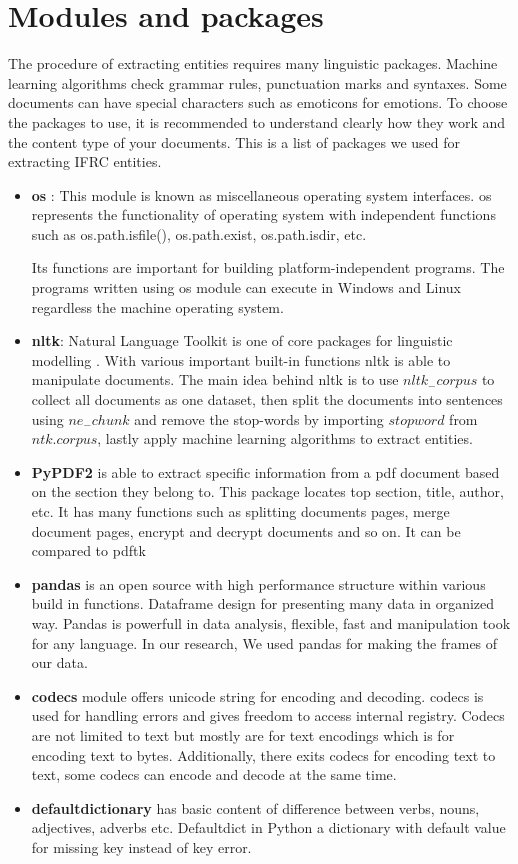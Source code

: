 \section{Modules and packages}
The procedure of extracting entities requires many linguistic packages. Machine learning algorithms check grammar rules, punctuation marks and syntaxes. Some
documents can have special characters such as emoticons for emotions. To choose the packages to use, it is recommended to understand clearly how they work and the content type of your documents. This is a list of packages we used for extracting IFRC entities.
\begin{itemize}
\item \textbf{os} : This module is  known as miscellaneous operating system interfaces. os represents the functionality of operating system with independent functions such as os.path.isfile(), os.path.exist, os.path.isdir, etc.  

  Its functions are important for building platform-independent programs. The programs written  using os module  can execute in Windows and Linux regardless the machine operating system. 

\item \textbf{nltk}: Natural Language Toolkit is one of core packages for linguistic modelling . With various important  built-in functions nltk is able to manipulate documents.  The main idea behind nltk is to use $nltk_{-}corpus$ to collect all documents as one dataset, then split the documents into sentences using $ne_{-}chunk$ and  remove the stop-words by  importing $stopword$ from $ntk.corpus$, lastly apply machine learning algorithms to extract entities.

\item \textbf{PyPDF2} is able to extract specific information from a pdf document based on the section they belong to. This package locates top section, title, author, etc. It has many functions such as splitting documents pages, merge document pages, encrypt and decrypt documents and so on. It can be compared to pdftk
\item \textbf{pandas} is an open source with high performance structure within various build in functions.
  Dataframe design for presenting many data in organized way. Pandas is powerfull in data analysis, flexible, fast and manipulation took for any language. In our research, We used pandas for making the frames of our data.
  
\item \textbf{codecs} module  offers unicode string for encoding and decoding. codecs is used for handling errors and gives freedom to access internal registry. Codecs are not limited to text but mostly are for text encodings which is for encoding text to bytes. Additionally, there exits codecs for encoding text to text, some codecs can encode and decode at the same time.
\item  \textbf{defaultdictionary} has basic content of difference between verbs, nouns, adjectives, adverbs etc.  Defaultdict in Python  a dictionary with default value for missing key instead of key error.


\end{itemize}
